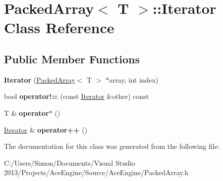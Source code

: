 \hypertarget{class_packed_array_1_1_iterator}{}\section{Packed\+Array$<$ T $>$\+:\+:Iterator Class Reference}
\label{class_packed_array_1_1_iterator}
\subsection*{Public Member Functions}
\begin{DoxyCompactItemize}
\item 
\hypertarget{class_packed_array_1_1_iterator_a9fc8cedaff923687224b1d65757a3eb7}{}{\bfseries Iterator} (\hyperlink{class_packed_array}{Packed\+Array}$<$ T $>$ $\ast$array, int index)\label{class_packed_array_1_1_iterator_a9fc8cedaff923687224b1d65757a3eb7}

\item 
\hypertarget{class_packed_array_1_1_iterator_a1700f8c71530649d4c0d7328560e9bb0}{}bool {\bfseries operator!=} (const \hyperlink{class_packed_array_1_1_iterator}{Iterator} \&other) const \label{class_packed_array_1_1_iterator_a1700f8c71530649d4c0d7328560e9bb0}

\item 
\hypertarget{class_packed_array_1_1_iterator_a79006061b967f1c8b7066fa832a4ca7c}{}T \& {\bfseries operator$\ast$} ()\label{class_packed_array_1_1_iterator_a79006061b967f1c8b7066fa832a4ca7c}

\item 
\hypertarget{class_packed_array_1_1_iterator_a893e8475ad043777fbc626782d4e399e}{}\hyperlink{class_packed_array_1_1_iterator}{Iterator} \& {\bfseries operator++} ()\label{class_packed_array_1_1_iterator_a893e8475ad043777fbc626782d4e399e}

\end{DoxyCompactItemize}


The documentation for this class was generated from the following file\+:\begin{DoxyCompactItemize}
\item 
C\+:/\+Users/\+Simon/\+Documents/\+Visual Studio 2013/\+Projects/\+Ace\+Engine/\+Source/\+Ace\+Engine/Packed\+Array.\+h\end{DoxyCompactItemize}
